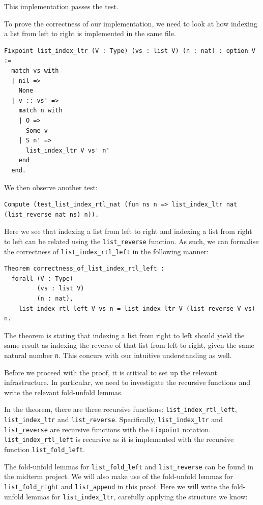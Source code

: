 \documentclass{article}
\begin{document}
This implementation passes the test. 

To prove the correctness of our implementation, we need to look at how indexing a list from left to right is implemented in the same file.

\begin{lstlisting}
Fixpoint list_index_ltr (V : Type) (vs : list V) (n : nat) : option V :=
  match vs with
  | nil =>
    None
  | v :: vs' =>
    match n with
    | O =>
      Some v
    | S n' =>
      list_index_ltr V vs' n'
    end
  end.
\end{lstlisting}

We then observe another test:

\begin{lstlisting}
Compute (test_list_index_rtl_nat (fun ns n => list_index_ltr nat (list_reverse nat ns) n)).
\end{lstlisting}

Here we see that indexing a list from left to right and indexing a list from right to left can be related using the \texttt{list\_reverse} function. As such, we can formalise the correctness of \texttt{list\_index\_rtl\_left} in the following manner:

\begin{lstlisting}
Theorem correctness_of_list_index_rtl_left :
  forall (V : Type)
         (vs : list V)
         (n : nat),
    list_index_rtl_left V vs n = list_index_ltr V (list_reverse V vs) n.
\end{lstlisting}

The theorem is stating that indexing a list from right to left should yield the same result as indexing the reverse of that list from left to right, given the same natural number \texttt{n}. This concurs with our intuitive understanding as well.

Before we proceed with the proof, it is critical to set up the relevant infrastructure. In particular, we need to investigate the recursive functions and write the relevant fold-unfold lemmas. 

In the theorem, there are three recursive functions: \texttt{list\_index\_rtl\_left}, \texttt{list\_index\_ltr} and \texttt{list\_reverse}. Specifically, \texttt{list\_index\_ltr} and \texttt{list\_reverse} are recursive functions with the \texttt{Fixpoint} notation. \texttt{list\_index\_rtl\_left} is recursive as it is implemented with the recursive function \texttt{list\_fold\_left}.

The fold-unfold lemmas for \texttt{list\_fold\_left} and \texttt{list\_reverse} can be found in the midterm project. We will also make use of the fold-unfold lemmas for \texttt{list\_fold\_right} and \texttt{list\_append} in this proof. Here we will write the fold-unfold lemmas for \texttt{list\_index\_ltr}, carefully applying the structure we know:
\end{document}

